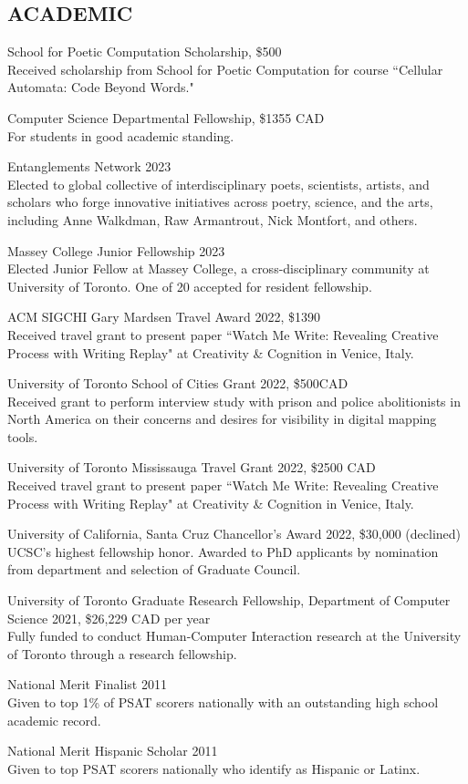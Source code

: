  \subsection{ACADEMIC}
 
School for Poetic Computation Scholarship, \$500  \\
Received scholarship from School for Poetic Computation for course ``Cellular Automata: Code Beyond Words."
 
Computer Science Departmental Fellowship, \$1355 CAD \\
For students in good academic standing. 
 
Entanglements Network 2023 \\
 Elected to global collective of interdisciplinary poets, scientists, artists, and scholars who forge innovative initiatives across poetry, science, and the arts, including Anne Walkdman, Raw Armantrout, Nick Montfort, and others. 

 Massey College Junior Fellowship 2023 \\
 Elected Junior Fellow at Massey College, a cross-disciplinary community at University of Toronto. One of 20 accepted for resident fellowship.  
 
 ACM SIGCHI Gary Mardsen Travel Award 2022, \$1390  \\
Received travel grant to present paper ``Watch Me Write: Revealing Creative Process with Writing Replay" at Creativity \& Cognition in Venice, Italy.
 
University of Toronto School of Cities Grant 2022, \$500CAD \\
Received grant to perform interview study with prison and police abolitionists in North America on their concerns and desires for visibility in digital mapping tools.

University of Toronto Mississauga Travel Grant 2022, \$2500 CAD \\
Received travel grant to present paper ``Watch Me Write: Revealing Creative Process with Writing Replay" at Creativity \& Cognition in Venice, Italy.

University of California, Santa Cruz Chancellor's Award 2022, \$30,000 (declined) \\
UCSC's highest fellowship honor. Awarded to PhD applicants by nomination from department and selection of Graduate Council.

University of Toronto Graduate Research Fellowship, Department of Computer Science 2021, \$26,229 CAD per year \\
Fully funded to conduct Human-Computer Interaction research at the University of Toronto through a research fellowship. 

National Merit Finalist 2011 \\
Given to top 1\% of PSAT scorers nationally with an outstanding high school academic record. 

National Merit Hispanic Scholar 2011 \\
Given to top PSAT scorers nationally who identify as Hispanic or Latinx. 